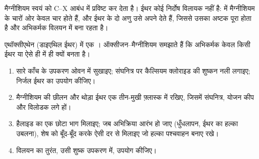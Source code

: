 मैग्नीशियम स्वयं को C--X आबंध में प्रविष्ट कर देता है। ईथर कोई
निर्दोष विलायक नहीं है:  में मैग्नीशियम के चारों ओर केवल चार 
होते हैं, और ईथर के दो अणु उसे अपने  देते हैं, जिससे
उसका अष्टक पूरा होता है और अभिकर्मक विलयन में बना रहता है।

\begin{omfigure}

{\small एथॉक्सीएथेन (डाइएथिल ईथर) में एक ।
ऑक्सीजन--मैग्नीशियम  समझाते हैं कि अभिकर्मक केवल किसी
ईथर या ऐसे ही  में ही क्यों बनता है।}
\end{omfigure}

\begin{method}[ग्रीन्यार अभिकर्मक बनाना]\label{met:b1:organomagnesium:prepare}
\begin{enumerate}
  \item सारे काँच के उपकरण ओवन में सुखाइए; संघनित्र पर कैल्सियम क्लोराइड की
        शुष्कन नली लगाइए; निर्जल ईथर का उपयोग कीजिए।
  \item मैग्नीशियम की छीलन और थोड़ा ईथर एक तीन-मुखी
        फ़्लास्क में रखिए, जिसमें संघनित्र, योजन कीप और विलोडक लगे हों।
  \item हैलाइड का एक छोटा भाग मिलाइए; जब अभिक्रिया आरंभ हो जाए
        (धुँधलापन, ईथर का हल्का उबलना), शेष को बूँद-बूँद करके
        ऐसी दर से मिलाइए जो हल्का पश्चवाहन बनाए रखे।
  \item विलयन का तुरंत, उसी शुष्क उपकरण में, उपयोग कीजिए।
\end{enumerate}
\end{method}

